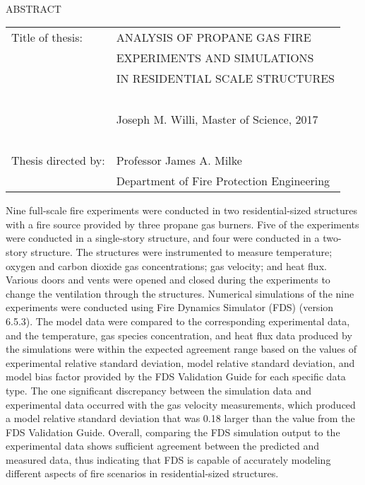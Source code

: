 
\hbox{\ }

\renewcommand{\baselinestretch}{1}
\small \normalsize

\begin{center}
\large{{ABSTRACT}} 

\vspace{3em} 

\end{center}
\hspace{-.15in}
\begin{tabular}{ll}
Title of thesis:		& {\large  ANALYSIS OF PROPANE GAS FIRE}	\\
							& {\large  EXPERIMENTS AND SIMULATIONS} 	\\
							& {\large  IN RESIDENTIAL SCALE STRUCTURES} \\
\ \\
							& {\large  Joseph M. Willi, Master of Science, 2017} \\
\ \\
Thesis directed by: 	& {\large  Professor James A. Milke} \\
							& {\large  Department of Fire Protection Engineering} \\
\end{tabular}

\vspace{3em}

\renewcommand{\baselinestretch}{2}
\large \normalsize

Nine full-scale fire experiments were conducted in two residential-sized structures with a fire source provided by three propane gas burners. Five of the experiments were conducted in a single-story structure, and four were conducted in a two-story structure. The structures were instrumented to measure temperature; oxygen and carbon dioxide gas concentrations; gas velocity; and heat flux. Various doors and vents were opened and closed during the experiments to change the ventilation through the structures. Numerical simulations of the nine experiments were conducted using Fire Dynamics Simulator (FDS) (version 6.5.3). The model data  were compared to the corresponding experimental data, and the temperature, gas species concentration, and heat flux data produced by the simulations were within the expected agreement range based on the values of experimental relative standard deviation, model relative standard deviation, and model bias factor provided by the FDS Validation Guide for each specific data type. The one significant discrepancy between the simulation data and experimental data occurred with the gas velocity measurements, which produced a model relative standard deviation that was 0.18 larger than the value from the FDS Validation Guide. Overall, comparing the FDS simulation output to the experimental data shows sufficient agreement between the predicted and measured data, thus indicating that FDS is capable of accurately modeling different aspects of fire scenarios in residential-sized structures.


